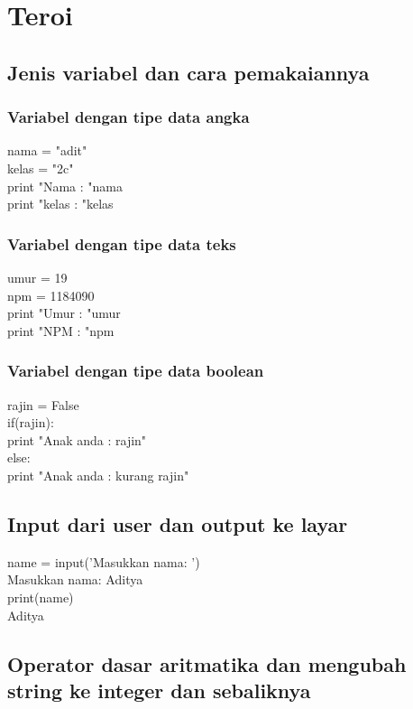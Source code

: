 \documentclass[12pt, times new roman, a4paper]{article}
\begin{document}
\section{Teroi}

\subsection{Jenis variabel dan cara pemakaiannya}

\subsubsection{Variabel dengan tipe data angka}
nama = "adit"\\
kelas = "2c"\\
print "Nama : "nama\\
print "kelas : "kelas\\
\subsubsection{Variabel dengan tipe data teks}
umur = 19\\
npm = 1184090\\
print "Umur : "umur\\
print "NPM : "npm\\
\subsubsection{Variabel dengan tipe data boolean}
rajin = False\\
if(rajin):\\
	print "Anak anda : rajin"\\
else:\\
	print "Anak anda : kurang rajin"\\
	
\subsection{Input dari user dan output ke layar}
name = input('Masukkan nama: ')\\
Masukkan nama: Aditya\\
print(name)\\
Aditya\\

\subsection{Operator dasar aritmatika dan mengubah string ke integer dan sebaliknya}
\end{document}
